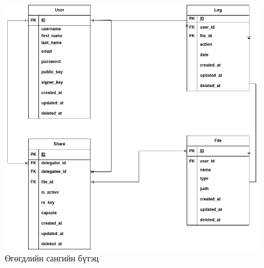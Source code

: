 \begin{figure}[H]
    \centering
    \includegraphics[scale=0.4]{Figures/system_schemes/database.drawio.png}
    \caption[pyUmbral]{Өгөгдлийн сангийн бүтэц}
    \label{fig:database}
\end{figure}

